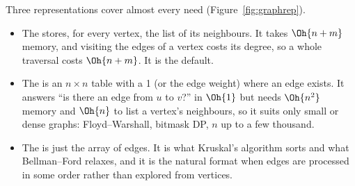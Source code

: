 Three representations cover almost every need (Figure~\ref{fig:graphrep}).

\begin{itemize}
  \item The  stores, for every vertex, the list of its neighbours. It takes $\Oh{n + m}$ memory, and
        visiting the edges of a vertex costs its degree, so a whole traversal costs $\Oh{n + m}$. It is the default.
  \item The  is an $n \times n$ table with a 1 (or the edge weight) where an edge exists. It answers
        ``is there an edge from $u$ to $v$?'' in $\Oh{1}$ but needs $\Oh{n^2}$ memory and $\Oh{n}$ to list a vertex's
        neighbours, so it suits only small or dense graphs: Floyd--Warshall, bitmask DP, $n$ up to a few thousand.
  \item The  is just the array of edges. It is what Kruskal's algorithm sorts and what Bellman--Ford relaxes,
        and it is the natural format when edges are processed in some order rather than explored from vertices.
\end{itemize}

